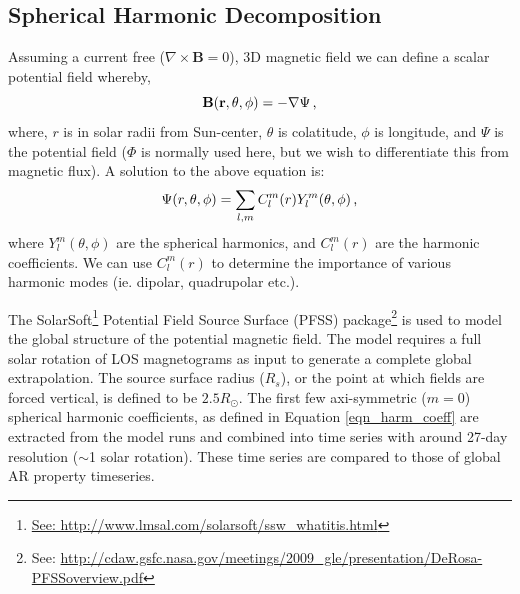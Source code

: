 
\subsection{Spherical Harmonic Decomposition}\label{sect:globsphhar}

Assuming a current free ($\nabla\times\mathbf{B}=0$), 3D magnetic field we can define a scalar potential field whereby,
\begin{equation}
\mathbf{B(r,\theta,\phi)}=-\nabla \Psi \mbox{\,,}
\end{equation}
where, $r$ is in solar radii from Sun-center, $\theta$ is colatitude, $\phi$ is longitude, and $\Psi$ is the potential field ($\Phi$ is normally used here, but we wish to differentiate this from magnetic flux). A solution to the above equation is:
\begin{equation}\label{eqn_harm_coeff}
\Psi(r,\theta,\phi)=\sum_{l,m}C_{l}^{m}(r)Y_{l}^{m}(\theta,\phi) \mbox{\,,}
\end{equation}
where $Y_{l}^{m}(\theta,\phi)$ are the spherical harmonics, and $C_{l}^{m}(r)$ are the harmonic coefficients. We can use $C_{l}^{m}(r)$ to determine the importance of various harmonic modes (ie. dipolar, quadrupolar etc.). 

The SolarSoft\footnote{\url{See: http://www.lmsal.com/solarsoft/ssw\_whatitis.html}} Potential Field Source Surface (PFSS) package\footnote{See: \url{http://cdaw.gsfc.nasa.gov/meetings/2009\_gle/presentation/DeRosa-PFSSoverview.pdf}} \citep{Schrijver:2003} is used to model the global structure of the potential magnetic field. The model requires a full solar rotation of \gls{LOS} magnetograms as input to generate a complete global extrapolation. The source surface radius ($R_{s}$), or the point at which fields are forced vertical, is defined to be $2.5R_{\odot}$. The first few axi-symmetric ($m=0$) spherical harmonic coefficients, as defined in Equation \ref{eqn_harm_coeff} are extracted from the model runs and combined into time series with around 27-day resolution ($\sim$1 solar rotation). These time series are compared to those of global \gls{AR} property timeseries.


